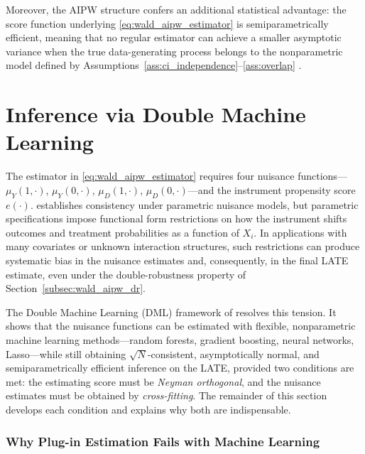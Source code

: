 \documentclass[12pt,a4paper]{article}
\begin{document}
Moreover, the AIPW structure confers an additional statistical advantage: the score function
underlying \eqref{eq:wald_aipw_estimator} is semiparametrically efficient, meaning that no
regular estimator can achieve a smaller asymptotic variance when the true data-generating
process belongs to the nonparametric model defined by
Assumptions~\ref{ass:ci_independence}--\ref{ass:overlap}
\citep[Theorem~1]{tan2006distributional}.






\section{Inference via Double Machine Learning}
\label{subsec:wald_aipw_dml}
 
The estimator in \eqref{eq:wald_aipw_estimator} requires four nuisance functions---
$\mu_Y(1,\cdot)$, $\mu_Y(0,\cdot)$, $\mu_D(1,\cdot)$, $\mu_D(0,\cdot)$---and the
instrument propensity score $e(\cdot)$. \citet{tan2006regression} establishes
consistency under parametric nuisance models, but parametric specifications impose
functional form restrictions on how the instrument shifts outcomes and treatment
probabilities as a function of $X_i$. In applications with many covariates or unknown
interaction structures, such restrictions can produce systematic bias in the nuisance
estimates and, consequently, in the final LATE estimate, even under the double-robustness
property of Section~\ref{subsec:wald_aipw_dr}.
 
The Double Machine Learning (DML) framework of \citet{chernozhukov2018double} resolves
this tension. It shows that the nuisance functions can be estimated with flexible,
nonparametric machine learning methods---random forests, gradient boosting, neural
networks, Lasso---while still obtaining $\sqrt{N}$-consistent, asymptotically normal,
and semiparametrically efficient inference on the LATE, provided two conditions are met:
the estimating score must be \emph{Neyman orthogonal}, and the nuisance estimates must be
obtained by \emph{cross-fitting}. The remainder of this section develops each condition
and explains why both are indispensable.
 
\subsubsection{Why Plug-in Estimation Fails with Machine Learning}
\label{subsubsec:plugin_fails}
 
\end{document}
